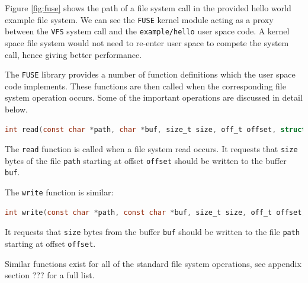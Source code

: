 \documentclass[paper=a4, fontsize=11pt,twoside]{scrartcl}    %
\numberwithin{table}{section}
\numberwithin{figure}{section}
\begin{document}
Figure \ref{fig:fuse} shows the path of a file system call in the provided hello world example file system. We can see the \texttt{FUSE} kernel module acting as a proxy between the \texttt{VFS} system call and the \texttt{example/hello} user space code. A kernel space file system would not need to re-enter user space to compete the system call, hence giving better performance. 

The \texttt{FUSE} library provides a number of function definitions which the user space code implements. These functions are then called when the corresponding file system operation occurs. Some of the important operations are discussed in detail below.\\

\begin{lstlisting}[language=C, caption={\texttt{FUSE} read operation.}, frame=single]
	int read(const char *path, char *buf, size_t size, off_t offset, struct fuse_file_info *fi);
\end{lstlisting}

\noindent
The \texttt{read} function is called when a file system read occurs. It requests that \texttt{size} bytes of the file \texttt{path} starting at offset \texttt{offset} should be written to the buffer \texttt{buf}.

The \texttt{write} function is similar:\\

\begin{lstlisting}[language=C, caption={\texttt{FUSE} write operation.}, frame=single]
	int write(const char *path, const char *buf, size_t size, off_t offset, struct fuse_file_info *fi);
\end{lstlisting}

\noindent
It requests that \texttt{size} bytes from the buffer \texttt{buf} should be written to the file \texttt{path} starting at offset \texttt{offset}.

Similar functions exist for all of the standard file system operations, see appendix section ??? for a full list. 
\end{document}
